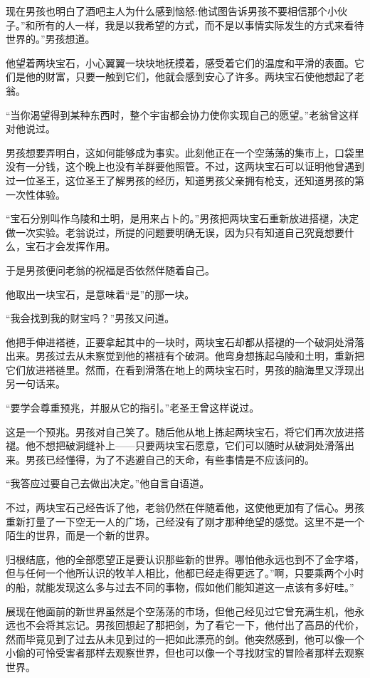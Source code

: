 \documentclass[twoside,openany]{book}
\begin{document}
现在男孩也明白了酒吧主人为什么感到恼怒:他试图告诉男孩不要相信那个小伙子。”和所有的人一样，我是以我希望的方式，而不是以事情实际发生的方式来看待世界的。”男孩想道。

他望着两块宝石，小心翼翼一块块地抚摸着，感受着它们的温度和平滑的表面。它们是他的财富，只要一触到它们，他就会感到安心了许多。两块宝石使他想起了老翁。

“当你渴望得到某种东西时，整个宇宙都会协力使你实现自己的愿望。”老翁曾这样对他说过。

男孩想要弄明白，这如何能够成为事实。此刻他正在一个空荡荡的集市上，口袋里没有一分钱，这个晚上也没有羊群要他照管。不过，这两块宝石可以证明他曾遇到过一位圣王，这位圣王了解男孩的经历，知道男孩父亲拥有枪支，还知道男孩的第一次性体验。

“宝石分别叫作乌陵和土明，是用来占卜的。”男孩把两块宝石重新放进搭褪，决定做一次实验。老翁说过，所提的问题要明确无误，因为只有知道自己究竟想要什么，宝石才会发挥作用。

于是男孩便问老翁的祝福是否依然伴随着自己。

他取出一块宝石，是意味着“是”的那一块。

“我会找到我的财宝吗？”男孩又问道。

他把手伸进褡裢，正要拿起其中的一块时，两块宝石却都从搭褪的一个破洞处滑落出来。男孩过去从未察觉到他的褡裢有个破洞。他弯身想拣起乌陵和土明，重新把它们放进褡裢里。然而，在看到滑落在地上的两块宝石时，男孩的脑海里又浮现出另一句话来。

“要学会尊重预兆，并服从它的指引。”老圣王曾这样说过。

这是一个预兆。男孩对自己笑了。随后他从地上拣起两块宝石，将它们再次放进搭褪。他不想把破洞缝补上——只要两块宝石愿意，它们可以随时从破洞处滑落出来。男孩已经懂得，为了不逃避自己的天命，有些事情是不应该问的。

“我答应过要自己去做出决定。”他自言自语道。

不过，两块宝石己经告诉了他，老翁仍然在伴随着他，这使他更加有了信心。男孩重新打量了一下空无一人的广场，己经没有了刚才那种绝望的感觉。这里不是一个陌生的世界，而是一个新的世界。

归根结底，他的全部愿望正是要认识那些新的世界。哪怕他永远也到不了金字塔，但与任何一个他所认识的牧羊人相比，他都已经走得更远了。”啊，只要乘两个小时的船，就能发现这么多与过去不同的事物，假如他们能知道这一点该有多好哇。”

展现在他面前的新世界虽然是个空荡荡的市场，但他己经见过它曾充满生机，他永远也不会将其忘记。男孩回想起了那把剑，为了看它一下，他付出了高昂的代价，然而毕竟见到了过去从未见到过的一把如此漂亮的剑。他突然感到，他可以像一个小偷的可怜受害者那样去观察世界，但也可以像一个寻找财宝的冒险者那样去观察世界。
\end{document}
